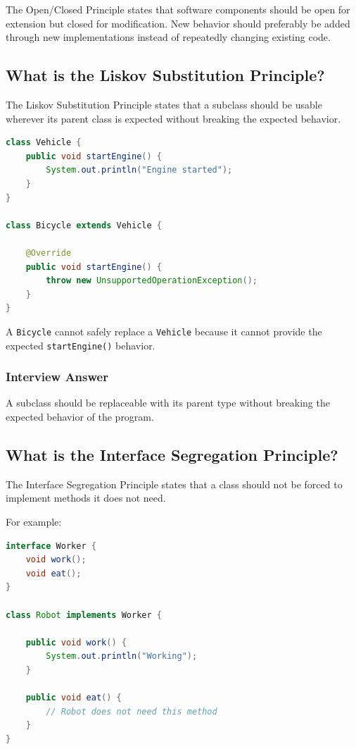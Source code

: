 \documentclass[12pt,a4paper]{article}
\begin{document}
The Open/Closed Principle states that software components should be open
for extension but closed for modification. New behavior should preferably
be added through new implementations instead of repeatedly changing
existing code.

\subsection{What is the Liskov Substitution Principle?}

The Liskov Substitution Principle states that a subclass should be usable
wherever its parent class is expected without breaking the expected behavior.

\begin{lstlisting}[language=Java]
class Vehicle {
    public void startEngine() {
        System.out.println("Engine started");
    }
}

class Bicycle extends Vehicle {

    @Override
    public void startEngine() {
        throw new UnsupportedOperationException();
    }
}
\end{lstlisting}

A \texttt{Bicycle} cannot safely replace a \texttt{Vehicle} because it
cannot provide the expected \texttt{startEngine()} behavior.

\subsubsection*{Interview Answer}

A subclass should be replaceable with its parent type without breaking the
expected behavior of the program.

\subsection{What is the Interface Segregation Principle?}

The Interface Segregation Principle states that a class should not be forced
to implement methods it does not need.

For example:

\begin{lstlisting}[language=Java]
interface Worker {
    void work();
    void eat();
}

class Robot implements Worker {

    public void work() {
        System.out.println("Working");
    }

    public void eat() {
        // Robot does not need this method
    }
}
\end{lstlisting}
\end{document}
